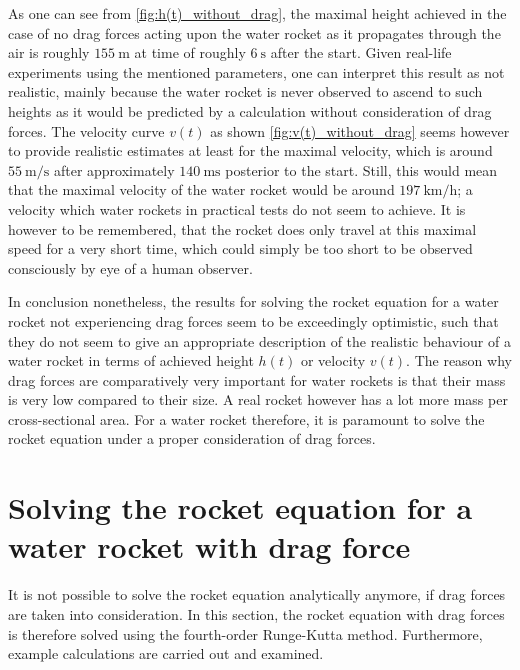 \documentclass[a4paper,11pt]{report}
\begin{document}
As one can see from \cref{fig:h(t)_without_drag}, the maximal height achieved in the case of no drag forces acting upon the water rocket as it propagates through the air is roughly $\SI{155}{\meter}$ at time of roughly $\SI{6}{\second}$ after the start. Given real-life experiments using the mentioned parameters, one can interpret this result as not realistic, mainly because the water rocket is never observed to ascend to such heights as it would be predicted by a calculation without consideration of drag forces. The velocity curve $v(t)$ as shown \cref{fig:v(t)_without_drag} seems however to provide realistic estimates at least for the maximal velocity, which is around $\SI{55}{\meter\per\second}$ after approximately $\SI{140}{\milli\second}$ posterior to the start. Still, this would mean that the maximal velocity of the water rocket would be around $\SI{197}{\kilo\meter\per\hour}$; a velocity which water rockets in practical tests do not seem to achieve. It is however to be remembered, that the rocket does only travel at this maximal speed for a very short time, which could simply be too short to be observed consciously by eye of a human observer.

In conclusion nonetheless, the results for solving the rocket equation for a water rocket not experiencing drag forces seem to be exceedingly optimistic, such that they do not seem to give an appropriate description of the realistic behaviour of a water rocket in terms of achieved height $h(t)$ or velocity $v(t)$. The reason why drag forces are comparatively very important for water rockets is that their mass is very low compared to their size. A real rocket however has a lot more mass per cross-sectional area. For a water rocket therefore, it is paramount to solve the rocket equation under a proper consideration of drag forces.

\section{Solving the rocket equation for a water rocket with drag force}
It is not possible to solve the rocket equation analytically anymore, if drag forces are taken into consideration. In this section, the rocket equation with drag forces is therefore solved using the fourth-order Runge-Kutta method. Furthermore, example calculations are carried out and examined.
\end{document}
